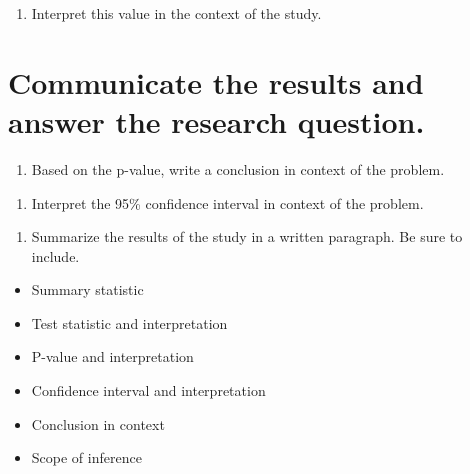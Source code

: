 \documentclass[
]{report}
\providecommand{\tightlist}{%
  \setlength{\itemsep}{0pt}\setlength{\parskip}{0pt}}
\begin{document}
\vspace{1in}

\begin{enumerate}
\def\labelenumi{\arabic{enumi}.}
\setcounter{enumi}{18}
\tightlist
\item
  Interpret this value in the context of the study.
\end{enumerate}

\vspace{1in}

\hypertarget{communicate-the-results-and-answer-the-research-question.-2}{%
\section{Communicate the results and answer the research question.}\label{communicate-the-results-and-answer-the-research-question.-2}}

\begin{enumerate}
\def\labelenumi{\arabic{enumi}.}
\setcounter{enumi}{19}
\tightlist
\item
  Based on the p-value, write a conclusion in context of the problem.
\end{enumerate}

\vspace{1in}

\begin{enumerate}
\def\labelenumi{\arabic{enumi}.}
\setcounter{enumi}{20}
\tightlist
\item
  Interpret the 95\% confidence interval in context of the problem.
\end{enumerate}

\vspace{1in}

\begin{enumerate}
\def\labelenumi{\arabic{enumi}.}
\setcounter{enumi}{21}
\tightlist
\item
  Summarize the results of the study in a written paragraph. Be sure to include.
\end{enumerate}

\begin{itemize}
\item
  Summary statistic
\item
  Test statistic and interpretation
\item
  P-value and interpretation
\item
  Confidence interval and interpretation
\item
  Conclusion in context
\item
  Scope of inference
\end{itemize}
\end{document}
